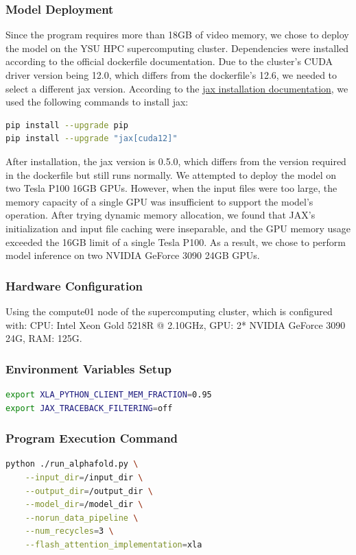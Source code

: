 \documentclass[a4paper,12pt]{article}
\begin{document}
\subsubsection{Model Deployment}
Since the program requires more than 18GB of video memory, we chose to deploy the model on the YSU HPC supercomputing cluster. Dependencies were installed according to the official dockerfile documentation. Due to the cluster's CUDA driver version being 12.0, which differs from the dockerfile's 12.6, we needed to select a different jax version. According to the \href{https://docs.jax.dev/en/latest/installation.html#nvidia-gpu}{jax installation documentation}, we used the following commands to install jax:

\begin{lstlisting}[language=bash]
pip install --upgrade pip
pip install --upgrade "jax[cuda12]"
\end{lstlisting}

After installation, the jax version is 0.5.0, which differs from the version required in the dockerfile but still runs normally.
We attempted to deploy the model on two Tesla P100 16GB GPUs. However, when the input files were too large, the memory capacity of a single GPU was insufficient to support the model's operation. After trying dynamic memory allocation, we found that JAX's initialization and input file caching were inseparable, and the GPU memory usage exceeded the 16GB limit of a single Tesla P100. As a result, we chose to perform model inference on two NVIDIA GeForce 3090 24GB GPUs.
\subsubsection{Hardware Configuration}
Using the compute01 node of the supercomputing cluster, which is configured with: CPU: Intel Xeon Gold 5218R @ 2.10GHz, GPU: 2* NVIDIA GeForce 3090 24G, RAM: 125G.

\subsubsection{Environment Variables Setup}
\begin{lstlisting}[language=bash]
export XLA_PYTHON_CLIENT_MEM_FRACTION=0.95
export JAX_TRACEBACK_FILTERING=off
\end{lstlisting}

\subsubsection{Program Execution Command}
\begin{lstlisting}[language=bash]
python ./run_alphafold.py \
    --input_dir=/input_dir \
    --output_dir=/output_dir \
    --model_dir=/model_dir \
    --norun_data_pipeline \
    --num_recycles=3 \
    --flash_attention_implementation=xla
\end{lstlisting}
\end{document}
